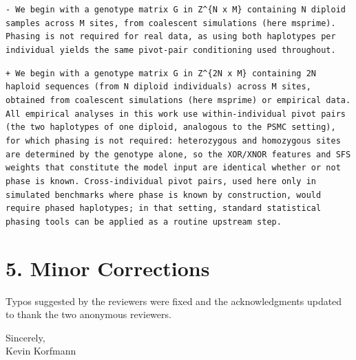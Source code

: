 \documentclass[10pt]{article}
\newcommand{\rem}[1]{\par\noindent\colorbox{rembg}{\parbox{\dimexpr\linewidth-2\fboxsep}{\small\textcolor{remtext}{\texttt{-\ #1}}}}}
\newcommand{\add}[1]{\par\noindent\colorbox{addbg}{\parbox{\dimexpr\linewidth-2\fboxsep}{\small\textcolor{addtext}{\texttt{+\ #1}}}}}
\begin{document}
\begin{mdframed}[style=diffbox]
\rem{We begin with a genotype matrix G in Z\^{}\{N x M\} containing N diploid samples across M sites, from coalescent simulations (here msprime). Phasing is not required for real data, as using both haplotypes per individual yields the same pivot-pair conditioning used throughout.}
\add{We begin with a genotype matrix G in Z\^{}\{2N x M\} containing 2N haploid sequences (from N diploid individuals) across M sites, obtained from coalescent simulations (here msprime) or empirical data. All empirical analyses in this work use within-individual pivot pairs (the two haplotypes of one diploid, analogous to the PSMC setting), for which phasing is not required: heterozygous and homozygous sites are determined by the genotype alone, so the XOR/XNOR features and SFS weights that constitute the model input are identical whether or not phase is known. Cross-individual pivot pairs, used here only in simulated benchmarks where phase is known by construction, would require phased haplotypes; in that setting, standard statistical phasing tools can be applied as a routine upstream step.}
\end{mdframed}

\section*{\textcolor{accent}{5. Minor Corrections}}

Typos suggested by the reviewers were fixed and the acknowledgments updated
to thank the two anonymous reviewers.


\noindent Sincerely,\\[2pt]
\noindent Kevin Korfmann
\end{document}
